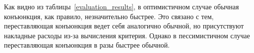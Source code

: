 \documentclass[submission,copyright,creativecommons]{eptcs}
\begin{document}
Как видно из таблицы~\ref{evaluation_results}, в оптимистичном случае обычная конъюнкция, как правило, незначительно быстрее. Это связано с тем, переставляющая конъюнкция ведет себя аналогично обычной, но присутствуют накладные расходы из-за вычисления критерия. Однако в пессимистичном случае переставляющая конъюнкция в разы быстрее обычной.



\end{document}
